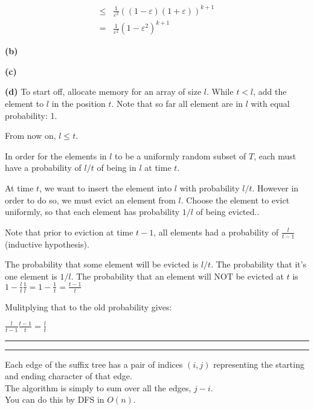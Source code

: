 \documentclass[11pt]{article}
\newcommand{\question}[2] {\vspace{.25in} \hrule\vspace{0.5em}
\noindent{\bf #1: #2} \vspace{0.5em}
\hrule \vspace{.10in}}
\renewcommand{\part}[1] {\vspace{.10in} {\bf (#1)}}
\begin{document}
\begin{align*}
\leq & \frac{1}{\varepsilon^2} ((1-\varepsilon)(1+\varepsilon))^{k+1}\\
= & \frac{1}{\varepsilon^2} (1-\varepsilon^2)^{k+1}
\end{align*}


\part{b}


\part{c}

\part{d}
To start off, allocate memory for an array of size $l$.
While $t<l$, add the element to $l$ in the position $t$.
Note that so far all element are in $l$ with equal probability: 1.

From now on, $l \leq t$.

In order for the elements in $l$ to be a uniformly random subset of $T$,
each must have a probability of $l/t$ of being in $l$ at time $t$.

At time $t$, we want to insert the element into $l$ with probability $l/t$.
However in order to do so, we must evict an element from $l$.
Choose the element to evict uniformly, so that each element has probability $1/l$ of being evicted..

Note that prior to eviction at time $t-1$, all elements had a probability of $\frac{l}{t-1}$ (inductive hypothesis).


The probability that some element will be evicted is $l/t$.
The probability that it's one element is $1/l$.
The probability that an element will NOT be evicted at $t$ is $1 - \frac{l}{t} \frac{1}{l} = 1 - \frac{1}{t} = \frac{t-1}{t}$

Mulitplying that to the old probability gives:

$\frac{l}{t-1} \frac{t-1}{t}  = \frac{l}{t}$



\question{2}{Counting Substrings}

Each edge of the suffix tree has a pair of indices $(i,j)$ representing the starting and ending character of that edge.\\
The algorithm is simply to sum over all the edges, $j-i$.\\
You can do this by DFS in $O(n)$.
\end{document}
